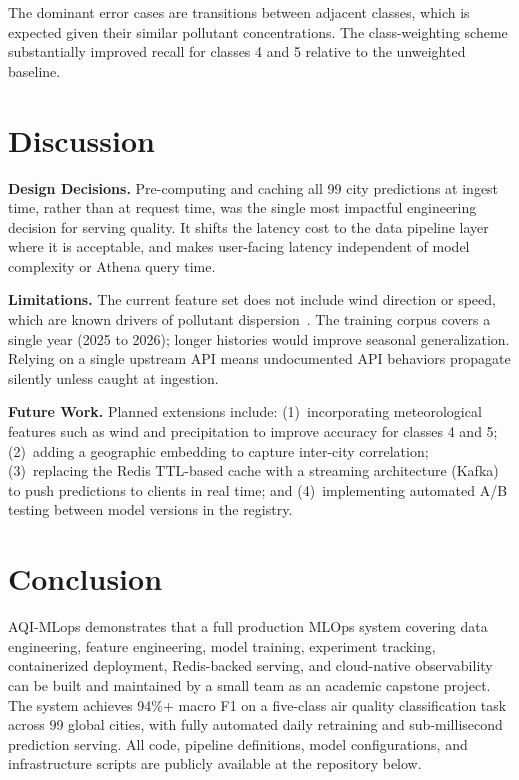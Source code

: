 \documentclass[sigconf, nonacm]{acmart}
\begin{document}
The dominant error cases are transitions between adjacent
classes, which is expected given their similar pollutant
concentrations.  The class-weighting scheme substantially
improved recall for classes 4 and 5 relative to the
unweighted baseline.

\section{Discussion}

\textbf{Design Decisions.}
Pre-computing and caching all 99 city predictions at ingest
time, rather than at request time, was the single most
impactful engineering decision for serving quality.  It
shifts the latency cost to the data pipeline layer where it
is acceptable, and makes user-facing latency independent of
model complexity or Athena query time.

\textbf{Limitations.}
The current feature set does not include wind direction or
speed, which are known drivers of pollutant
dispersion~\cite{cmaq2006}.  The training corpus covers a
single year (2025 to 2026); longer histories would improve
seasonal generalization.  Relying on a single upstream API
means undocumented API behaviors propagate silently unless
caught at ingestion.

\textbf{Future Work.}
Planned extensions include: (1)~incorporating
meteorological features such as wind and precipitation to
improve accuracy for classes 4 and 5; (2)~adding a
geographic embedding to capture inter-city correlation;
(3)~replacing the Redis TTL-based cache with a streaming
architecture (Kafka) to push predictions to clients in real
time; and (4)~implementing automated A/B testing between
model versions in the registry.

\section{Conclusion}

AQI-MLops demonstrates that a full production MLOps system
covering data engineering, feature engineering, model
training, experiment tracking, containerized deployment,
Redis-backed serving, and cloud-native observability can be
built and maintained by a small team as an academic capstone
project.  The system achieves 94\%+ macro F1 on a
five-class air quality classification task across 99 global
cities, with fully automated daily retraining and
sub-millisecond prediction serving.  All code, pipeline
definitions, model configurations, and infrastructure
scripts are publicly available at the repository below.
\end{document}

